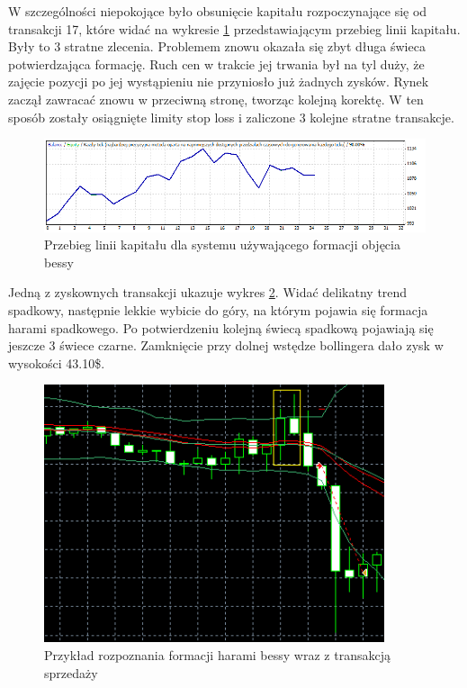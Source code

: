 \documentclass[pdflatex,11pt]{aghdpl}
\begin{document}
W szczególności niepokojące było obsunięcie kapitału rozpoczynające się od transakcji 17, które widać na wykresie \ref{linia_kap_harami} przedstawiającym przebieg linii kapitału. Były to 3 stratne zlecenia. Problemem znowu okazała się zbyt długa świeca potwierdzająca formację. Ruch cen w trakcie jej trwania był na tyl duży, że zajęcie pozycji po jej wystąpieniu nie przyniosło już żadnych zysków. Rynek zaczął zawracać znowu w przeciwną stronę, tworząc kolejną korektę. W ten sposób zostały osiągnięte limity stop loss i zaliczone 3 kolejne stratne transakcje.
\begin{figure}[h!]
\begin{center}
\includegraphics[width=16cm]{bearishharami/linia_kap.png}
\caption{Przebieg linii kapitału dla systemu używającego formacji objęcia bessy}
\label{linia_kap_harami}
\end{center}
\end{figure} 

Jedną z zyskownych transakcji ukazuje wykres \ref{przyklad_harami_bessy}. Widać delikatny trend spadkowy, następnie lekkie wybicie do góry, na którym pojawia się formacja harami spadkowego. Po potwierdzeniu kolejną świecą spadkową pojawiają się jeszcze 3 świece czarne. Zamknięcie przy dolnej wstędze bollingera dało zysk w wysokości 43.10\$. 
\begin{figure}[h!]
\begin{center}
\includegraphics[width=10cm]{bearishharami/przyklad.png}
\caption{Przykład rozpoznania formacji harami bessy wraz z transakcją sprzedaży}
\label{przyklad_harami_bessy}
\end{center}
\end{figure} 
\end{document}
